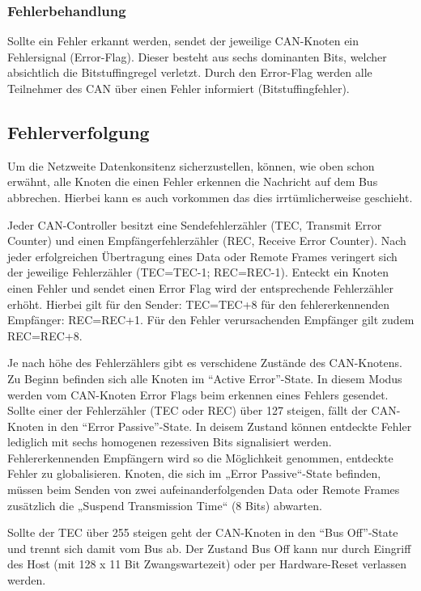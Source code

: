\subsubsection{Fehlerbehandlung}

Sollte ein Fehler erkannt werden, sendet der jeweilige CAN-Knoten ein Fehlersignal (Error-Flag). Dieser
besteht aus sechs dominanten Bits, welcher absichtlich die Bitstuffingregel verletzt. Durch den Error-Flag
werden alle Teilnehmer des CAN über einen Fehler informiert (Bitstuffingfehler).

\subsection{Fehlerverfolgung}

Um die Netzweite Datenkonsitenz sicherzustellen, können, wie oben schon erwähnt, alle Knoten die einen 
Fehler erkennen die Nachricht auf dem Bus abbrechen. Hierbei kann es auch vorkommen das dies 
irrtümlicherweise geschieht.

Jeder CAN-Controller besitzt eine Sendefehlerzähler (TEC, Transmit Error Counter) und einen 
Empfängerfehlerzähler (REC, Receive Error Counter). Nach jeder erfolgreichen Übertragung eines 
Data oder Remote Frames veringert sich der jeweilige Fehlerzähler (TEC=TEC-1; REC=REC-1). 
Enteckt ein Knoten einen Fehler und sendet einen Error Flag wird der entsprechende Fehlerzähler 
erhöht. Hierbei gilt für den Sender: TEC=TEC+8 für den fehlererkennenden Empfänger: REC=REC+1.
Für den Fehler verursachenden Empfänger gilt zudem REC=REC+8.

Je nach höhe des Fehlerzählers gibt es verschidene Zustände des CAN-Knotens. Zu Beginn befinden
sich alle Knoten im ``Active Error''-State. In diesem Modus werden vom CAN-Knoten Error Flags beim 
erkennen eines Fehlers gesendet. Sollte einer der Fehlerzähler (TEC oder REC) über 127 steigen, fällt 
der CAN-Knoten in den ``Error Passive''-State. In deisem Zustand können entdeckte Fehler lediglich 
mit sechs homogenen rezessiven Bits signalisiert werden. Fehlererkennenden Empfängern wird so die 
Möglichkeit genommen, entdeckte Fehler zu globalisieren. Knoten, die sich im „Error Passive“-State 
befinden, müssen beim Senden von zwei aufeinanderfolgenden Data oder Remote Frames zusätzlich 
die „Suspend Transmission Time“ (8 Bits) abwarten.

Sollte der TEC über 255 steigen geht der CAN-Knoten in den ``Bus Off''-State und trennt sich damit
vom Bus ab. Der Zustand Bus Off kann nur durch Eingriff des Host (mit 128 x 11 Bit Zwangswartezeit) 
oder per Hardware-Reset verlassen werden.

